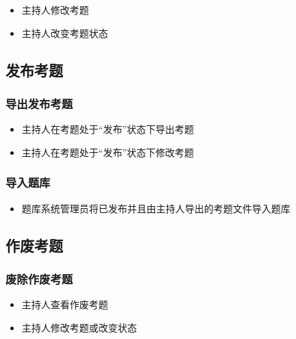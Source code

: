 \documentclass[hyperref, a4paper]{ctexart}
\providecommand{\tightlist}{%
  \setlength{\itemsep}{0pt}\setlength{\parskip}{0pt}}
\begin{document}
\begin{itemize}
\tightlist
\item
  主持人修改考题
\item
  主持人改变考题状态
\end{itemize}

\hypertarget{ux53d1ux5e03ux8003ux9898}{%
\subsection{发布考题}\label{ux53d1ux5e03ux8003ux9898}}

\hypertarget{ux5bfcux51faux53d1ux5e03ux8003ux9898}{%
\subsubsection{导出发布考题}\label{ux5bfcux51faux53d1ux5e03ux8003ux9898}}

\begin{itemize}
\tightlist
\item
  主持人在考题处于``发布''状态下导出考题
\item
  主持人在考题处于``发布''状态下修改考题
\end{itemize}

\hypertarget{ux5bfcux5165ux9898ux5e93}{%
\subsubsection{导入题库}\label{ux5bfcux5165ux9898ux5e93}}

\begin{itemize}
\tightlist
\item
  题库系统管理员将已发布并且由主持人导出的考题文件导入题库
\end{itemize}

\hypertarget{ux4f5cux5e9fux8003ux9898}{%
\subsection{作废考题}\label{ux4f5cux5e9fux8003ux9898}}

\hypertarget{ux5e9fux9664ux4f5cux5e9fux8003ux9898}{%
\subsubsection{废除作废考题}\label{ux5e9fux9664ux4f5cux5e9fux8003ux9898}}

\begin{itemize}
\tightlist
\item
  主持人查看作废考题
\item
  主持人修改考题或改变状态
\end{itemize}
\end{document}
